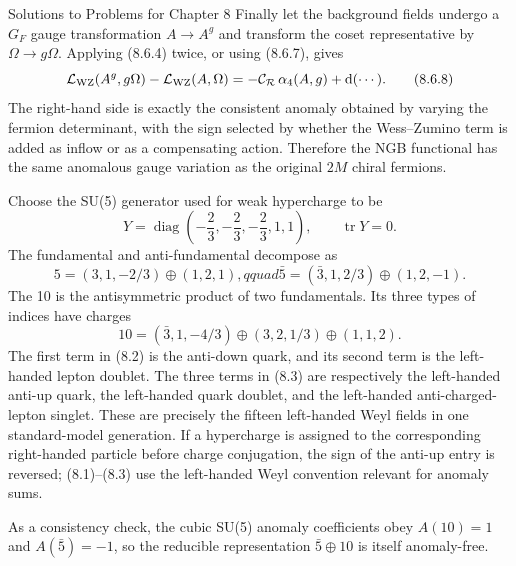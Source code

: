 \begin{bankssolutions}{Solutions to Problems for Chapter 8}
Finally let the background fields undergo a $G_F$ gauge transformation
$A\to A^g$ and transform the coset representative by
$\Omega\to g\Omega$.  Applying (8.6.4) twice, or using (8.6.7), gives
\[
  \mathcal L_{\rm WZ}(A^g,g\Omega)-\mathcal L_{\rm WZ}(A,\Omega)
  =-\mathcal C_{\mathcal R}\,\alpha_4(A,g)
  +\mathop{}\!\mathrm{d}(\cdots).
  \tag{8.6.8}
\]
The right-hand side is exactly the consistent anomaly obtained by varying the
fermion determinant, with the sign selected by whether the Wess--Zumino term
is added as inflow or as a compensating action.  Therefore the NGB functional
has the same anomalous gauge variation as the original $2M$ chiral fermions.

Choose the SU(5) generator used for weak hypercharge to be
\[
  Y=\operatorname{diag}\left(-\frac23,-\frac23,-\frac23,1,1\right),
  \qquad \operatorname{tr}Y=0 .
  \tag{8.7.1}
\]
The fundamental and anti-fundamental decompose as
\[
  5=(3,1,-2/3)\oplus(1,2,1),qquad
  \bar5=(\bar3,1,2/3)\oplus(1,2,-1).
  \tag{8.7.2}
\]
The 10 is the antisymmetric product of two fundamentals.  Its three types of
indices have charges
\[
  10=(\bar3,1,-4/3)\oplus(3,2,1/3)\oplus(1,1,2).
  \tag{8.7.3}
\]
The first term in (8.2) is the anti-down quark, and its second term is the
left-handed lepton doublet.  The three terms in (8.3) are respectively the
left-handed anti-up quark, the left-handed quark doublet, and the left-handed
anti-charged-lepton singlet.  These are precisely the fifteen left-handed
Weyl fields in one standard-model generation.  If a hypercharge is assigned
to the corresponding right-handed particle before charge conjugation, the sign
of the anti-up entry is reversed; (8.1)--(8.3) use the left-handed Weyl
convention relevant for anomaly sums.

As a consistency check, the cubic SU(5) anomaly coefficients obey
$A(10)=1$ and $A(\bar5)=-1$, so the reducible representation
$\bar5\oplus10$ is itself anomaly-free.


\end{bankssolutions}
